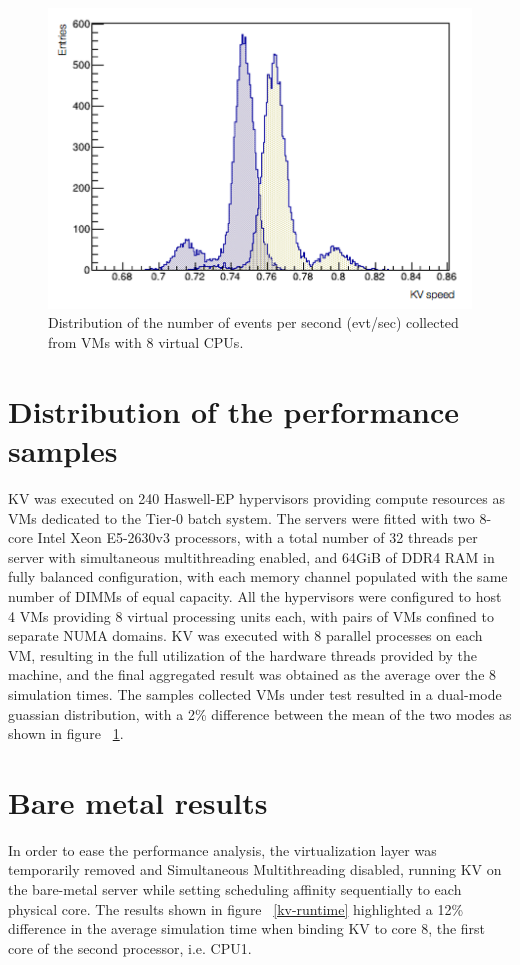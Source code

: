 \documentclass[a4paper]{jpconf}
\begin{document}
\begin{figure}
\begin{center}
\includegraphics[scale=0.5]{images/dual-mode-gaussian.png}
\end{center}
\caption{\label{dual-mode-gaussian} Distribution of the number of events per 
second (evt/sec) collected from VMs with 8 virtual CPUs. }
\end{figure}

\section{Distribution of the performance samples}
KV was executed on 240 Haswell-EP hypervisors providing compute
resources as VMs dedicated to the Tier-0 batch system. The servers were
fitted with two 8-core Intel Xeon E5-2630v3 processors, with a total number  
of 32 threads per server with simultaneous multithreading enabled, and 64GiB    
of DDR4 RAM in fully balanced configuration, with each memory channel populated with
the same number of DIMMs of equal capacity. All the hypervisors were configured 
to host 4 VMs providing 8 virtual processing units each, with pairs of VMs 
confined to separate NUMA domains. KV was executed with 8 parallel processes 
on each VM, resulting in the full utilization of the hardware threads provided
by the machine, and the final aggregated result was obtained as the average over 
the 8 simulation times. The samples collected VMs under test resulted in a 
dual-mode guassian distribution, with a 2\% difference between the 
mean of the two modes as shown in figure 
~\ref{dual-mode-gaussian}.

\section{Bare metal results}
In order to ease the performance analysis, the virtualization layer was
temporarily removed and Simultaneous Multithreading disabled, running KV on 
the bare-metal server while setting scheduling affinity sequentially to each physical
core. The results shown
in figure ~\ref{kv-runtime} highlighted a 12\% difference in the average simulation
time when binding KV to core 8, the first core of the second processor, i.e. CPU1.
\end{document}
